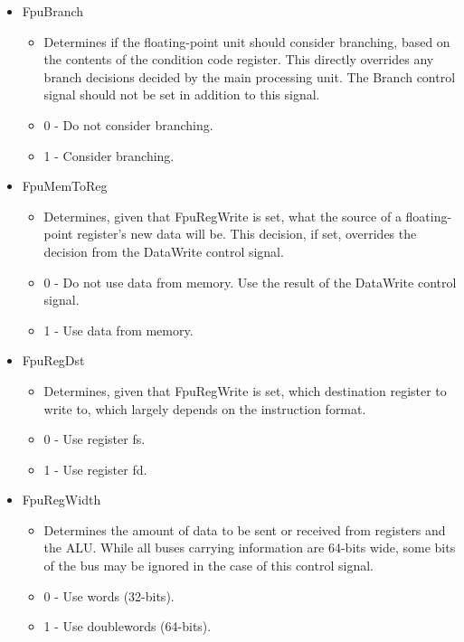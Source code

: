 \documentclass[
    paper=letter,
    parskip=half,
    fontsize=12pt,
    titlepage=firstiscover,
    toc=bibliography,
    numbers=endperiod
]{scrartcl}
\providecommand{\tightlist}{%
  \setlength{\itemsep}{0pt}\setlength{\parskip}{0pt}}
\begin{document}
\begin{itemize}
    \item FpuBranch
          \begin{itemize}
              \tightlist
              \item Determines if the floating-point unit should consider branching, based
                    on the contents of the condition code register. This directly overrides
                    any branch decisions decided by the main processing unit. The Branch
                    control signal should not be set in addition to this signal.
              \item 0 - Do not consider branching.
              \item 1 - Consider branching.
          \end{itemize}

    \item FpuMemToReg
          \begin{itemize}
              \tightlist
              \item Determines, given that FpuRegWrite is set, what the source of a
                    floating-point register's new data will be. This decision, if set,
                    overrides the decision from the DataWrite control signal.
              \item 0 - Do not use data from memory. Use the result of the DataWrite
                    control signal.
              \item 1 - Use data from memory.
          \end{itemize}

    \item FpuRegDst
          \begin{itemize}
              \tightlist
              \item Determines, given that FpuRegWrite is set, which destination register to
                    write to, which largely depends on the instruction format.
              \item 0 - Use register fs.
              \item 1 - Use register fd.
          \end{itemize}

    \item FpuRegWidth
          \begin{itemize}
              \tightlist
              \item Determines the amount of data to be sent or received from registers and
                    the ALU. While all buses carrying information are 64-bits wide, some
                    bits of the bus may be ignored in the case of this control signal.
              \item 0 - Use words (32-bits).
              \item 1 - Use doublewords (64-bits).
          \end{itemize}


\end{itemize}
\end{document}
